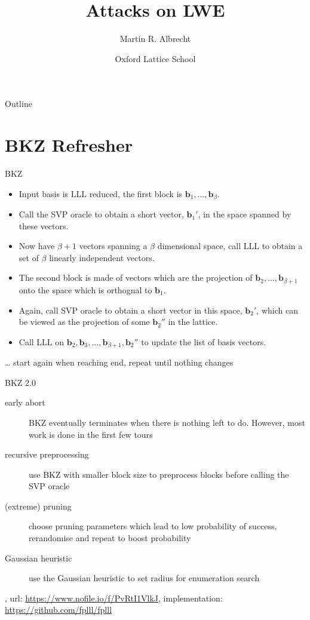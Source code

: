 \documentclass[presentation,smaller]{beamer}
\author{Martin R. Albrecht}
\date{Oxford Lattice School}
\title{Attacks on LWE}
\renewcommand{\vec}[1]{\mathbf{#1}\xspace}
\begin{document}
\maketitle
\begin{frame}{Outline}
\tableofcontents
\end{frame}


\section{BKZ Refresher}
\label{sec:org54b4bf5}
\begin{frame}[label={sec:org045d98d}]{BKZ}
\begin{itemize}
\item Input basis is LLL reduced, the \alert{first block} is \(\vec{b}_1,\dots,\vec{b}_{β}\).
\item Call the SVP oracle to obtain a short vector, \(\vec{b}_1'\), in the space spanned by these vectors.
\item Now have \(β+1\) vectors spanning a \(β\) dimensional space, call LLL to obtain a set of \(β\) linearly independent vectors.
\item The \alert{second block} is made of vectors which are the projection of \(\vec{b}_2,\dots, \vec{b}_{β+1}\) onto the space which is orthognal to \(\vec{b}_1\).
\item Again, call SVP oracle to obtain a short vector in this space, \(\vec{b}_2'\), which can be viewed as the projection of some \(\vec{b}_2''\) in the lattice.
\item Call LLL on \(\vec{b}_2, \vec{b}_3,\dots, \vec{b}_{β+1}, \vec{b}_2''\) to update the list of basis vectors.
\end{itemize}

… start again when reaching end, repeat until nothing changes
\end{frame}

\begin{frame}[label={sec:orge1faeee}]{BKZ 2.0}
\begin{description}
\item[{early abort}] BKZ eventually terminates when there is nothing left to do. However, most work is done in the first few tours
\item[{recursive preprocessing}] use BKZ with smaller block size to preprocess blocks before calling the SVP oracle
\item[{(extreme) pruning}] choose pruning parameters which lead to low probability of success, rerandomise and repeat to boost probability
\item[{Gaussian heuristic}] use the Gaussian heuristic to set radius for enumeration search
\end{description}

\begin{block}{}
,
url: \url{https://www.nofile.io/f/PvRtI1VlkJ},
implementation: \url{https://github.com/fplll/fplll}
\end{block}
\end{frame}
\end{document}
